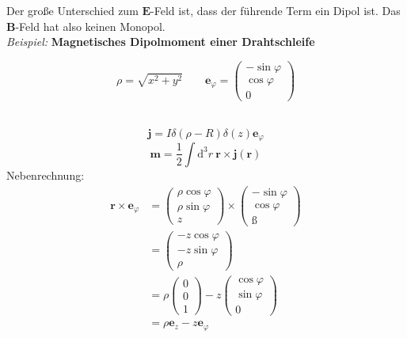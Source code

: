 \documentclass[titlepage,11pt,a4paper,ngerman]{report}
\newcommand{\tx}[1]{\textrm{#1}}
\newcommand{\dd}{\tx{d}}
\renewcommand{\vec}[1]{\boldsymbol{#1}}
\begin{document}
\noindent
Der große Unterschied zum $ \vec{E} $-Feld ist, dass der führende Term ein Dipol ist. Das $ \vec{B} $-Feld hat also keinen Monopol.\\[5pt]
\emph{Beispiel:} \textbf{Magnetisches Dipolmoment einer Drahtschleife}\\
\begin{minipage}{.5\linewidth}
	$$ \rho = \sqrt{x^2 + y^2} \qquad \vec{e}_{\varphi} = \begin{pmatrix}
	- \sin \varphi \\ \cos \varphi \\ 0
	\end{pmatrix}$$
\end{minipage}%
\begin{minipage}{.5\linewidth}
	\centering
\end{minipage}%
\\
\begin{equation*}
\vec{j} = I \delta(\rho - R) \delta(z) \vec{e}_{\varphi}
\end{equation*}
\begin{equation*}
\vec{m} = \frac{1}{2} \int \dd^3 r \ \vec{r} \times \vec{j}(\vec{r})
\end{equation*}
Nebenrechnung:
\begin{align*}
\vec{r} \times \vec{e}_{\varphi} &= \begin{pmatrix}
\rho \cos \varphi \\ \rho \sin \varphi \\ z
\end{pmatrix} \times \begin{pmatrix}
- \sin \varphi \\ \cos \varphi \\ ß
\end{pmatrix}\\
&= \begin{pmatrix}
- z \cos \varphi \\ - z \sin \varphi \\ \rho
\end{pmatrix}\\
&= \rho \begin{pmatrix}
0 \\ 0 \\ 1
\end{pmatrix} - z \begin{pmatrix}
\cos \varphi \\ \sin \varphi \\ 0
\end{pmatrix}\\
&= \rho \vec{e}_z - z \vec{e}_{\varphi}
\end{align*}
\end{document}
